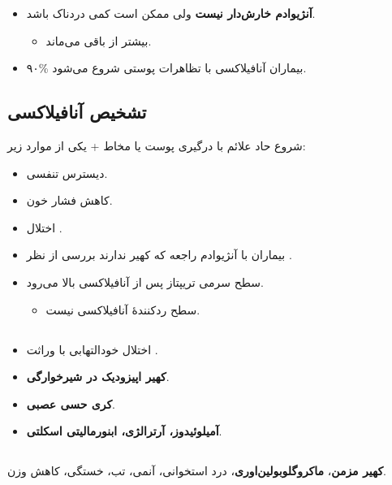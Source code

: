\documentclass[12pt,a4paper]{article}
\begin{document}
\clearpage
{}

\begin{itemize}
  \item \textbf{آنژیوادم خارش‌دار نیست} ولی ممکن است کمی دردناک باشد.
  \begin{itemize}
    \item بیشتر از  باقی می‌ماند.
  \end{itemize}
  \item ۹۰\% بیماران آنافیلاکسی \ANarrow{} با تظاهرات پوستی شروع می‌شود.
\end{itemize}

\subsection*{تشخیص آنافیلاکسی}
شروع حاد علائم با درگیری پوست یا مخاط + یکی از موارد زیر:
\begin{itemize}
  \item دیسترس تنفسی.
  \item کاهش فشار خون.
  \item اختلال .
\end{itemize}

\begin{itemize}
  \item بیماران با آنژیوادم راجعه که کهیر ندارند \ANarrow{} بررسی از نظر .
  \item سطح سرمی تریپتاز \ANarrow{}  پس از آنافیلاکسی بالا می‌رود.
  \begin{itemize}
    \item سطح  ردکنندهٔ آنافیلاکسی نیست.
  \end{itemize}
\end{itemize}

\subsection*{}
\begin{itemize}
  \item اختلال خودالتهابی با وراثت \textbf{}.
  \item \textbf{کهیر اپیزودیک در شیرخوارگی}.
  \item \textbf{کری حسی عصبی}.
  \item \textbf{آمیلوئیدوز، آرترالژی، ابنورمالیتی اسکلتی}.
\end{itemize}

\subsection*{}
\textbf{کهیر مزمن}، \textbf{ماکروگلوبولین‌اوری}، درد استخوانی، آنمی،
تب، خستگی، کاهش وزن.
\end{document}
